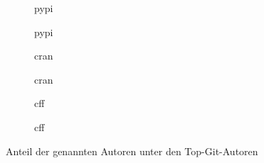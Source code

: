 \begin{figure}[H]
    \begin{subfigure}{.5\textwidth}
        \centering
        
        \caption{\gls{pypi}}
        \label{fig:common_authors_2_pypi}
    \end{subfigure}%
    \begin{subfigure}{.5\textwidth}
        \centering
        
        \caption{\gls{pypi}}
        \label{fig:common_authors_2_by_lines_pypi}
    \end{subfigure}
    \begin{subfigure}{.5\textwidth}
        \centering
        
        \caption{\gls{cran}}
        \label{fig:common_authors_2_cran}
    \end{subfigure}%
    \begin{subfigure}{.5\textwidth}
        \centering
        
        \caption{\gls{cran}}
        \label{fig:common_authors_2_by_lines_cran}
    \end{subfigure}
    \begin{subfigure}{.5\textwidth}
        \centering
        
        \caption{\gls{cff}}
        \label{fig:common_authors_2_cff}
    \end{subfigure}%
    \begin{subfigure}{.5\textwidth}
        \centering
        
        \caption{\gls{cff}}
        \label{fig:common_authors_2_by_lines_cff}
    \end{subfigure}
    \caption{Anteil der genannten Autoren unter den Top-Git-Autoren}
    \label{fig:common_authors_2_anhang}
\end{figure}

